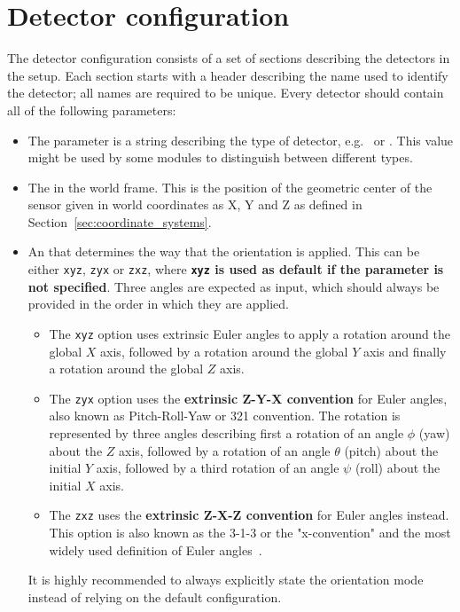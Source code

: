 \section{Detector configuration}
\label{sec:detector_config}
The detector configuration consists of a set of sections describing the detectors in the setup.
Each section starts with a header describing the name used to identify the detector; all names are required to be unique.
Every detector should contain all of the following parameters:
\begin{itemize}
\item The  parameter is a string describing the type of detector, e.g.\  or . This value might be used by some modules to distinguish between different types.
\item The  in the world frame.
This is the position of the geometric center of the sensor given in world coordinates as X, Y and Z as defined in Section~\ref{sec:coordinate_systems}.
\item An  that determines the way that the orientation is applied.
This can be either \texttt{xyz}, \texttt{zyx} or \texttt{zxz}, where \textbf{\texttt{xyz} is used as default if the parameter is not specified}. Three angles are expected as input, which should always be provided in the order in which they are applied.
\begin{itemize}
    \item The \texttt{xyz} option uses extrinsic Euler angles to apply a rotation around the global $X$ axis, followed by a rotation around the global $Y$ axis and finally a rotation around the global $Z$ axis.
    \item The \texttt{zyx} option uses the \textbf{extrinsic Z-Y-X convention} for Euler angles, also known as Pitch-Roll-Yaw or 321 convention. The rotation is represented by three angles describing first a rotation of an angle $\phi$ (yaw) about the $Z$ axis, followed by a rotation of an angle $\theta$ (pitch) about the initial $Y$ axis, followed by a third rotation of an angle $\psi$ (roll) about the initial $X$ axis.
    \item The \texttt{zxz} uses the \textbf{extrinsic Z-X-Z convention} for Euler angles instead. This option is also known as the 3-1-3 or the "x-convention" and the most widely used definition of Euler angles~\cite{eulerangles}.
\end{itemize}
\begin{warning}
It is highly recommended to always explicitly state the orientation mode instead of relying on the default configuration.
\end{warning}


\end{itemize}

